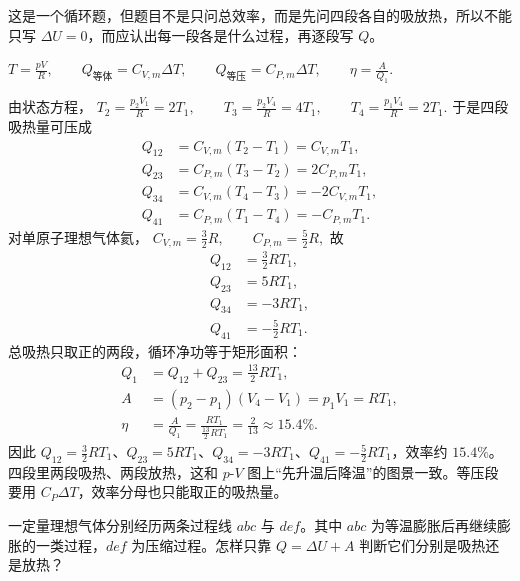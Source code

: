 \documentclass[lang=cn,11pt]{elegantbook}
\begin{document}
\begin{solution}
这是一个循环题，但题目不是只问总效率，而是先问四段各自的吸放热，所以不能只写 \(\Delta U=0\)，而应认出每一段各是什么过程，再逐段写 \(Q\)。

 \(T=\frac{pV}{R},\qquad Q_{\text{等体}}=C_{V,m}\Delta T,\qquad Q_{\text{等压}}=C_{P,m}\Delta T,\qquad \eta=\frac{A}{Q_1}.\) 

由状态方程，
 \(T_2=\frac{p_2V_1}{R}=2T_1,\qquad T_3=\frac{p_2V_4}{R}=4T_1,\qquad T_4=\frac{p_1V_4}{R}=2T_1.\) 
于是四段吸热量可压成
\[
\begin{aligned}
Q_{12}&=C_{V,m}(T_2-T_1)=C_{V,m}T_1,\\
Q_{23}&=C_{P,m}(T_3-T_2)=2C_{P,m}T_1,\\
Q_{34}&=C_{V,m}(T_4-T_3)=-2C_{V,m}T_1,\\
Q_{41}&=C_{P,m}(T_1-T_4)=-C_{P,m}T_1.
\end{aligned}
\]
对单原子理想气体氦，
 \(C_{V,m}=\frac{3}{2}R,\qquad C_{P,m}=\frac{5}{2}R,\) 
故
\[
\begin{aligned}
Q_{12}&=\frac{3}{2}RT_1,\\
Q_{23}&=5RT_1,\\
Q_{34}&=-3RT_1,\\
Q_{41}&=-\frac{5}{2}RT_1.
\end{aligned}
\]
总吸热只取正的两段，循环净功等于矩形面积：
\[
\begin{aligned}
Q_1&=Q_{12}+Q_{23}=\frac{13}{2}RT_1,\\
A&=(p_2-p_1)(V_4-V_1)=p_1V_1=RT_1,\\
\eta&=\frac{A}{Q_1}=\frac{RT_1}{\frac{13}{2}RT_1}=\frac{2}{13}\approx 15.4\%.
\end{aligned}
\]
因此 \(Q_{12}=\frac{3}{2}RT_1\)、\(Q_{23}=5RT_1\)、\(Q_{34}=-3RT_1\)、\(Q_{41}=-\frac{5}{2}RT_1\)，效率约 \(15.4\%\)。四段里两段吸热、两段放热，这和 \(p\)-\(V\) 图上“先升温后降温”的图景一致。等压段要用 \(C_P\Delta T\)，效率分母也只能取正的吸热量。
\end{solution}

\begin{exercise}[两条 \(p\)-\(V\) 过程线怎样只靠第一定律判断吸热还是放热]
一定量理想气体分别经历两条过程线 \(abc\) 与 \(def\)。其中 \(abc\) 为等温膨胀后再继续膨胀的一类过程，\(def\) 为压缩过程。怎样只靠 \(Q=\Delta U+A\) 判断它们分别是吸热还是放热？
\end{exercise}
\end{document}
